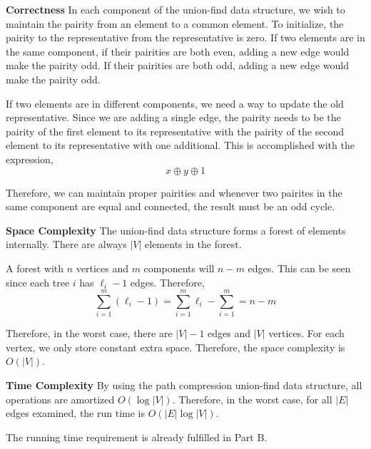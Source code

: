 \documentclass[12pt,twoside]{article}
\begin{document}
\begin{problems}
\begin{problemparts}
{\bf Correctness} In each component of the union-find data structure, we wish
to maintain the pairity from an element to a common element. To initialize,
the pairity to the representative from the representative is zero. If two
elements are in the same component, if their pairities are both even, adding
a new edge would make the pairity odd. If their pairities are both odd,
adding a new edge would make the pairity odd.

If two elements are in different components, we need a way to update the old
representative. Since we are adding a single edge, the pairity needs to be
the pairity of the first element to its representative with the pairity of
the second element to its representative with one additional. This is
accomplished with the expression,
$$ x \oplus y \oplus 1 $$

Therefore, we can maintain proper pairities and whenever two pairites in the
same component are equal and connected, the result must be an odd cycle.

{\bf Space Complexity} The union-find data structure forms a forest of
elements internally. There are always $|V|$ elements in the forest. 

A forest with $n$ vertices and $m$ components will $n - m$ edges. This can be
seen since each tree $i$ has $\ell_i - 1$ edges. Therefore,
$$ \sum_{i = 1}^m (\ell_i - 1) = \sum_{i = 1}^m \ell_i - \sum_{i = 1}^m = n -
m $$

Therefore, in the worst case, there are $|V| - 1$ edges and $|V|$ vertices.
For each vertex, we only store constant extra space. Therefore, the space
complexity is $O(|V|)$.

{\bf Time Complexity} By using the path compression union-find data
structure, all operations are amortized $O(\log |V|)$. Therefore, in the
worst case, for all $|E|$ edges examined, the run time is $O(|E| \log |V|)$.

\problempart %

The running time requirement is already fulfilled in Part B.

\end{problemparts}

\end{problems}
\end{document}
